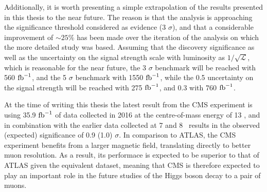 Additionally, it is worth presenting a simple extrapolation of the results
presented in this thesis to the near future. The reason is that the
analysis is approaching the significance threshold considered as 
evidence (3 $\sigma$), and that a considerable improvement of $\sim 25\%$
has been made over the iteration of the analysis on which the more detailed
study was based. Assuming that the discovery significance as well as the
uncertainty on the signal strength scale with luminosity as
$1/\sqrt{\mathcal{L}}$, which is reasonable for the near future,
the 3 $\sigma$ benchmark will be reached with 560 $\text{fb}^{-1}$, and the 5 $\sigma$
benchmark with 1550 $\text{fb}^{-1}$, while the 0.5 uncertainty on the signal strength
will be reached with 275 $\text{fb}^{-1}$, and 0.3 with 760 $\text{fb}^{-1}$.

At the time of writing this thesis the latest result from the CMS experiment
is using 35.9 $\text{fb}^{-1}$ of data collected in 2016 at the centre-of-mass energy
of 13 \TeV, and in combination with the earlier data collected at 7 and 8 \TeV~results
in the observed (expected) significance of 0.9 (1.0) $\sigma$.
In comparison to ATLAS, the CMS experiment benefits from a larger
magnetic field, translating directly to better muon resolution.
As a result, its performace is expected to be superior to that of ATLAS
given the equivalent dataset, meaning that CMS is therefore expected to play an
important role in the future studies of the Higgs boson decay to a pair
of muons.






